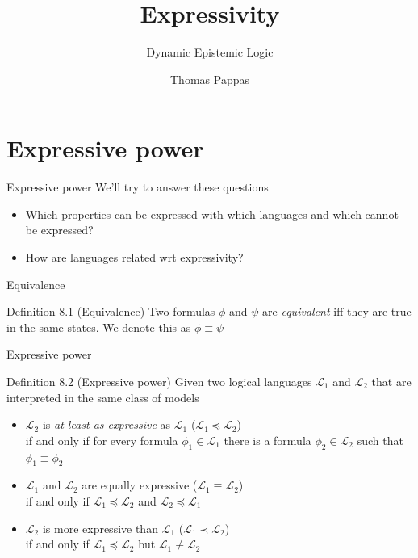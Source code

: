 \documentclass{beamer}
\newcommand{\lang}{\mathcal{L}}
\begin{document}
\title{Expressivity}
\subtitle{Dynamic Epistemic Logic}
\author[Pappas]{Thomas Pappas}
\maketitle

\setlength{\abovedisplayskip}{0pt}
\setlength{\belowdisplayskip}{5pt}
\setlength{\abovedisplayshortskip}{0pt}
\setlength{\belowdisplayshortskip}{0pt}



\section{Expressive power}

\begin{frame}{Expressive power}
	We'll try to answer these questions
	\begin{itemize}
		\item Which properties can be expressed with which languages and which cannot be expressed?
		\item How are languages related wrt expressivity?
	\end{itemize}
\end{frame}

\begin{frame}{Equivalence}
	\begin{block}{Definition 8.1 (Equivalence)}
		Two formulas $\phi$ and $\psi$ are \textit{equivalent} iff they are true in the same states. We denote this as $\phi \equiv \psi$
	\end{block}
\end{frame}

\begin{frame}{Expressive power}
  \begin{block}{Definition 8.2 (Expressive power)}
  	Given two logical languages $\lang_1$ and $\lang_2$ that are interpreted in the same class of models
  	\begin{itemize}
  		\item $\lang_2$ is \textit{at least as expressive} as $\lang_1$ ($\lang_1 \preceq \lang_2$)\\
  			if and only if for every formula $\phi_1 \in \lang_1$ there is a formula $\phi_2 \in \lang_2$ such that $\phi_1 \equiv \phi_2$ \pause
  		\item $\lang_1$ and $\lang_2$ are equally expressive ($\lang_1 \equiv \lang_2$)\\
  			if and only if $\lang_1 \preceq \lang_2$ and $\lang_2 \preceq \lang_1$ \pause
  		\item $\lang_2$ is more expressive than $\lang_1$ ($\lang_1 \prec \lang_2$)\\
  			if and only if $\lang_1 \preceq \lang_2$ but $\lang_1 \not\equiv \lang_2$
  	\end{itemize}
  \end{block}
\end{frame}
\end{document}
